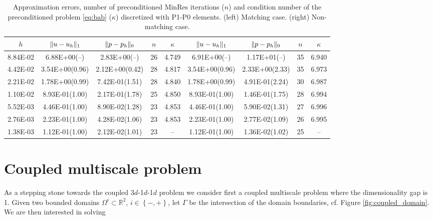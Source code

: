 \documentclass[r]{siamart171218}
\begin{document}
\begin{table}
  \begin{center}
    \footnotesize{
  \begin{tabular}{c|cc|c|c||cc|c|c}
    \hline
    $h$ & $\lVert{u-u_h}\rVert_1$ & $\lVert{p-p_h}\rVert_0$ & $n$ & $\kappa$
        & $\lVert{u-u_h}\rVert_1$ & $\lVert{p-p_h}\rVert_0$ & $n$ & $\kappa$ \\
    \hline
8.84E-02 & 6.88E+00(--)   & 2.83E+00(--)  & 26 & 4.749  & 6.91E+00(--)   & 1.17E+01(--)  & 35 & 6.940 \\
4.42E-02 & 3.54E+00(0.96) & 2.12E+00(0.42)& 28 & 4.817  & 3.54E+00(0.96) & 2.33E+00(2.33)& 35 & 6.973 \\
2.21E-02 & 1.78E+00(0.99) & 7.42E-01(1.51)& 28 & 4.840  & 1.78E+00(0.99) & 4.91E-01(2.24)& 30 & 6.987 \\
1.10E-02 & 8.93E-01(1.00) & 2.17E-01(1.78)& 25 & 4.850  & 8.93E-01(1.00) & 1.46E-01(1.75)& 28 & 6.994 \\
5.52E-03 & 4.46E-01(1.00) & 8.90E-02(1.28)& 23 & 4.853  & 4.46E-01(1.00) & 5.90E-02(1.31)& 27 & 6.996 \\
2.76E-03 & 2.23E-01(1.00) & 4.28E-02(1.06)& 23 & 4.853  & 2.23E-01(1.00) & 2.77E-02(1.09)& 26 & 6.995 \\
1.38E-03 & 1.12E-01(1.00) & 2.12E-02(1.01)& 23 & --     & 1.12E-01(1.00) & 1.36E-02(1.02)& 25 & --    \\  
    \hline
  \end{tabular}
    }
    \caption{Approximation errors, number of preconditioned MinRes iterations ($n$) and
      condition number of the preconditioned problem \eqref{eq:bab} ($\kappa$) discretized
      with P1-P0 elements. (left) Matching case. (right) Non-matching case.}
  \label{tab:p1_p0}
  \end{center}
\end{table}

\section{Coupled multiscale problem}\label{sec:coupled} As a stepping stone
towards the coupled 3$d$-1$d$-1$d$ problem we consider first a coupled multiscale
problem where the dimensionality gap is 1. Given two bounded domains $\Omega^i \subset\mathbb{R}^2$,
$i\in\left\{-, +\right\}$, let $\Gamma$ be the intersection of the domain boundaries,
cf. Figure \ref{fig:coupled_domain}. We are then interested in solving
\end{document}
